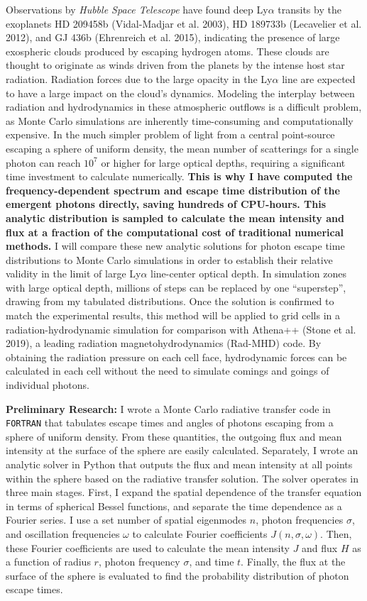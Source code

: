 \documentclass[11pt]{article}
\begin{document}
Observations by \textit{Hubble Space Telescope} have found deep Ly$\alpha$ transits by the exoplanets HD 209458b (Vidal-Madjar et al. 2003), HD 189733b (Lecavelier et al. 2012), and  GJ 436b (Ehrenreich et al. 2015), indicating the presence of large exospheric clouds produced by escaping hydrogen atoms. These clouds are thought to originate as winds driven from the planets by the intense host star radiation. Radiation forces due to the large opacity in the Ly$\alpha$ line are expected to have a large impact on the cloud's dynamics. Modeling the interplay between radiation and hydrodynamics in these atmospheric outflows is a difficult problem, as Monte Carlo simulations are inherently time-consuming and computationally expensive. In the much simpler problem of light from a central point-source escaping a sphere of uniform density, the mean number of scatterings for a single photon can reach $10^{7}$ or higher for large optical depths, requiring a significant time investment to calculate numerically. \textbf{This is why I have computed the frequency-dependent spectrum and escape time distribution of the emergent photons directly, saving hundreds of CPU-hours. This analytic distribution is sampled to calculate the mean intensity and flux at a fraction of the computational cost of traditional numerical methods.} I will compare these new analytic solutions for photon escape time distributions to Monte Carlo simulations in order to establish their relative validity in the limit of large Ly$\alpha$ line-center optical depth. In simulation zones with large optical depth, millions of steps can be replaced by one ``superstep'', drawing from my tabulated distributions. Once the solution is confirmed to match the experimental results, this method will be applied to grid cells in a radiation-hydrodynamic simulation for comparison with Athena++ (Stone et al. 2019), a leading radiation magnetohydrodynamics (Rad-MHD) code. By obtaining the radiation pressure on each cell face, hydrodynamic forces can be calculated in each cell without the need to simulate comings and goings of individual photons.

\textbf{Preliminary Research:} I wrote a Monte Carlo radiative transfer code in \texttt{FORTRAN} that tabulates escape times and angles of photons escaping from a sphere of uniform density. From these quantities, the outgoing flux and mean intensity at the surface of the sphere are easily calculated. Separately, I wrote an analytic solver in Python that outputs the flux and mean intensity at all points within the sphere based on the radiative transfer solution. The solver operates in three main stages. First, I expand the spatial dependence of the transfer equation in terms of spherical Bessel functions, and separate the time dependence as a Fourier series. I use a set number of spatial eigenmodes $n$, photon frequencies $\sigma$, and oscillation frequencies $\omega$ to calculate Fourier coefficients $J(n, \sigma, \omega)$. Then, these Fourier coefficients are used to calculate the mean intensity $J$ and flux $H$ as a function of radius $r$, photon frequency $\sigma$, and time $t$. Finally, the flux at the surface of the sphere is evaluated to find the probability distribution of photon escape times.
\end{document}

